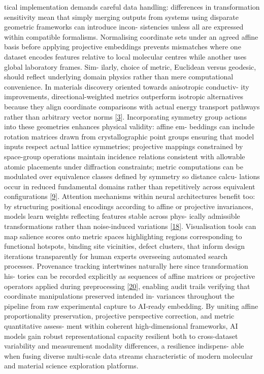 \documentclass[
]{article}
\begin{document}
tical implementation demands careful data handling: differences in
transformation sensitivity mean that simply merging outputs from systems
using disparate geometric frameworks can introduce incon- sistencies
unless all are expressed within compatible formalisms. Normalising
coordinate sets under an agreed affine basis before applying projective
embeddings prevents mismatches where one dataset encodes features
relative to local molecular centres while another uses global laboratory
frames. Sim- ilarly, choice of metric, Euclidean versus geodesic, should
reflect underlying domain physics rather than mere computational
convenience. In materials discovery oriented towards anisotropic
conductiv- ity improvements, directional-weighted metrics outperform
isotropic alternatives because they align coordinate comparisons with
actual energy transport pathways rather than arbitrary vector norms
{[}\hyperref[_bookmark43]{3}{]}. Incorporating symmetry group actions
into these geometries enhances physical validity: affine em- beddings
can include rotation matrices drawn from crystallographic point groups
ensuring that model inputs respect actual lattice symmetries; projective
mappings constrained by space-group operations maintain incidence
relations consistent with allowable atomic placements under diffraction
constraints; metric computations can be modulated over equivalence
classes defined by symmetry so distance calcu- lations occur in reduced
fundamental domains rather than repetitively across equivalent
configurations {[}\hyperref[_bookmark49]{9}{]}. Attention mechanisms
within neural architectures benefit too: by structuring positional
encodings according to affine or projective invariances, models learn
weights reflecting features stable across phys- ically admissible
transformations rather than noise-induced variations
{[}\hyperref[_bookmark58]{18}{]}. Visualisation tools can map salience
scores onto metric spaces highlighting regions corresponding to
functional hotspots, binding site vicinities, defect clusters, that
inform design iterations transparently for human experts overseeing
automated search processes. Provenance tracking intertwines naturally
here since transformation his- tories can be recorded explicitly as
sequences of affine matrices or projective operators applied during
preprocessing {[}\hyperref[_bookmark60]{20}{]}, enabling audit trails
verifying that coordinate manipulations preserved intended in- variances
throughout the pipeline from raw experimental capture to AI-ready
embedding. By uniting affine proportionality preservation, projective
perspective correction, and metric quantitative assess- ment within
coherent high-dimensional frameworks, AI models gain robust
representational capacity resilient both to cross-dataset variability
and measurement modality differences, a resilience indispens- able when
fusing diverse multi-scale data streams characteristic of modern
molecular and material science exploration platforms.
\end{document}
